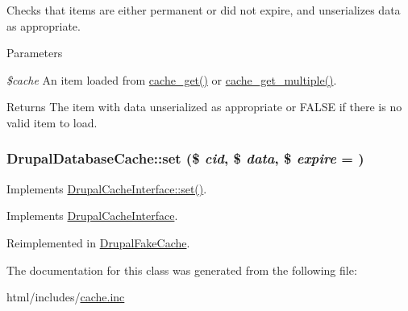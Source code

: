 Checks that items are either permanent or did not expire, and unserializes data as appropriate.


\begin{DoxyParams}{Parameters}
\item[{\em \$cache}]An item loaded from \hyperlink{includes_2cache_8inc_a9d873815c28909b61c3a6188b383f8a3}{cache\_\-get()} or \hyperlink{includes_2cache_8inc_a2c67628faec5b49aa0fdc987422540d4}{cache\_\-get\_\-multiple()}.\end{DoxyParams}
\begin{DoxyReturn}{Returns}
The item with data unserialized as appropriate or FALSE if there is no valid item to load. 
\end{DoxyReturn}
\hypertarget{classDrupalDatabaseCache_a8262bd7a36ca026f6b8c31c30c0f722d}{
\subsubsection[{set}]{\setlength{\rightskip}{0pt plus 5cm}DrupalDatabaseCache::set (\$ {\em cid}, \/  \$ {\em data}, \/  \$ {\em expire} = {})}}
\label{classDrupalDatabaseCache_a8262bd7a36ca026f6b8c31c30c0f722d}
Implements \hyperlink{interfaceDrupalCacheInterface_ab9bbd1913d6747a74585f36b9282594c}{DrupalCacheInterface::set()}. 

Implements \hyperlink{interfaceDrupalCacheInterface_ab9bbd1913d6747a74585f36b9282594c}{DrupalCacheInterface}.

Reimplemented in \hyperlink{classDrupalFakeCache_a54b3264101045168404dc3cedcfce970}{DrupalFakeCache}.

The documentation for this class was generated from the following file:\begin{DoxyCompactItemize}
\item 
html/includes/\hyperlink{includes_2cache_8inc}{cache.inc}\end{DoxyCompactItemize}
